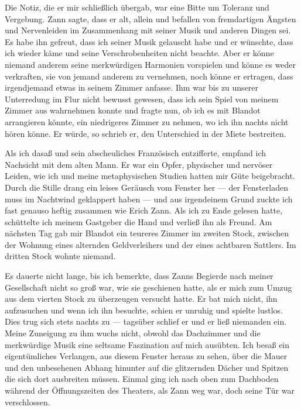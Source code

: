 \documentclass[a4paper]{memoir}
\begin{document}
Die Notiz, die er mir schließlich übergab, war eine Bitte um Toleranz und Vergebung. Zann sagte, dass er alt, allein und befallen von fremdartigen Ängsten und Nervenleiden im Zusammenhang mit seiner Musik und anderen Dingen sei. Es habe ihn gefreut, dass ich seiner Musik gelauscht habe und er wünschte, dass ich wieder käme und seine Verschrobenheiten nicht beachte. Aber er könne niemand anderem seine merkwürdigen Harmonien vorspielen und könne es weder verkraften, sie von jemand anderem zu vernehmen, noch könne er ertragen, dass irgendjemand etwas in seinem Zimmer anfasse. Ihm war bis zu unserer Unterredung im Flur nicht bewusst gewesen, dass ich sein Spiel von meinem Zimmer aus wahrnehmen konnte und fragte nun, ob ich es mit Blandot arrangieren könnte, ein niedrigeres Zimmer zu nehmen, wo ich ihn nachts nicht hören könne. Er würde, so schrieb er, den Unterschied in der Miete bestreiten.

Als ich dasaß und sein abscheuliches Französisch entzifferte, empfand ich Nachsicht mit dem alten Mann. Er war ein Opfer, physischer und nervöser Leiden, wie ich und meine metaphysischen Studien hatten mir Güte beigebracht. Durch die Stille drang ein leises Geräusch vom Fenster her --- der Fensterladen muss im Nachtwind geklappert haben --- und aus irgendeinem Grund zuckte ich fast genauso heftig zusammen wie Erich Zann. Als ich zu Ende gelesen hatte, schüttelte ich meinem Gastgeber die Hand und verließ ihn als Freund. Am nächsten Tag gab mir Blandot ein teureres Zimmer im zweiten Stock, zwischen der Wohnung eines alternden Geldverleihers und der eines achtbaren Sattlers. Im dritten Stock wohnte niemand.

Es dauerte nicht lange, bis ich bemerkte, dass Zanns Begierde nach meiner Gesellschaft nicht so groß war, wie sie geschienen hatte, als er mich zum Umzug aus dem vierten Stock zu überzeugen versucht hatte. Er bat mich nicht, ihn aufzusuchen und wenn ich ihn besuchte, schien er unruhig und spielte lustlos. Dies trug sich stets nachts zu --- tagsüber schlief er und er ließ niemanden ein. Meine Zuneigung zu ihm wuchs nicht, obwohl das Dachzimmer und die merkwürdige Musik eine seltsame Faszination auf mich ausübten. Ich besaß ein eigentümliches Verlangen, aus diesem Fenster heraus zu sehen, über die Mauer und den unbesehenen Abhang hinunter auf die glitzernden Dächer und Spitzen die sich dort ausbreiten müssen. Einmal ging ich nach oben zum Dachboden während der Öffnungszeiten des Theaters, als Zann weg war, doch seine Tür war verschlossen.
\end{document}
